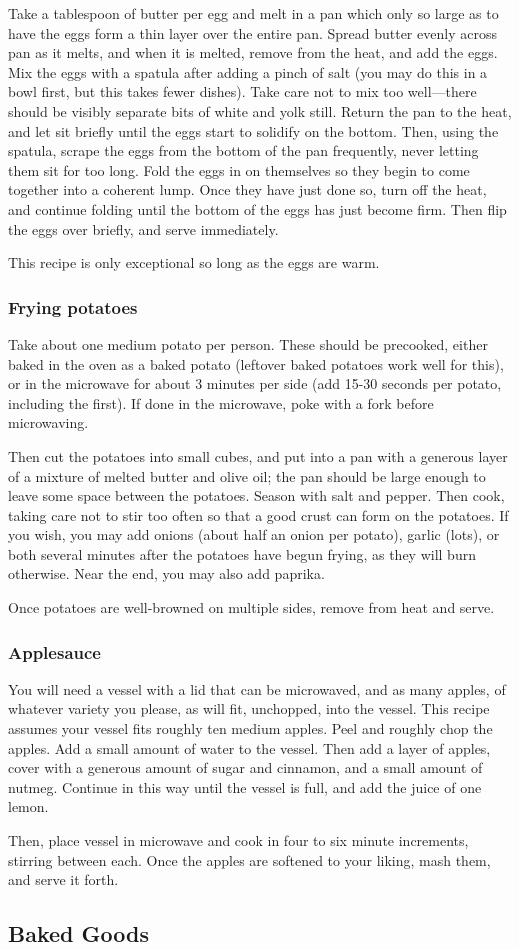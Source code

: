\documentclass[10pt]{article}
\begin{document}
Take a tablespoon of butter per egg and melt in a pan which only so large as to have the eggs form a thin layer over the entire pan.
Spread butter evenly across pan as it melts, and when it is melted, remove from the heat, and add the eggs.
Mix the eggs with a spatula after adding a pinch of salt (you may do this in a bowl first, but this takes fewer dishes).
Take care not to mix too well---there should be visibly separate bits of white and yolk still.
Return the pan to the heat, and let sit briefly until the eggs start to solidify on the bottom.
Then, using the spatula, scrape the eggs from the bottom of the pan frequently, never letting them sit for too long.
Fold the eggs in on themselves so they begin to come together into a coherent lump.
Once they have just done so, turn off the heat, and continue folding until the bottom of the eggs has just become firm.
Then flip the eggs over briefly, and serve immediately.

This recipe is only exceptional so long as the eggs are warm.

\subsubsection*{Frying potatoes}

Take about one medium potato per person.
These should be precooked, either baked in the oven as a baked potato (leftover baked potatoes work well for this), or in the microwave for about 3 minutes per side (add 15-30 seconds per potato, including the first).
If done in the microwave, poke with a fork before microwaving.

Then cut the potatoes into small cubes, and put into a pan with a generous layer of a mixture of melted butter and olive oil; the pan should be large enough to leave some space between the potatoes.
Season with salt and pepper.
Then cook, taking care not to stir too often so that a good crust can form on the potatoes.
If you wish, you may add onions (about half an onion per potato), garlic (lots), or both several minutes after the potatoes have begun frying, as they will burn otherwise.
Near the end, you may also add paprika.

Once potatoes are well-browned on multiple sides, remove from heat and serve.

\subsubsection*{Applesauce}

You will need a vessel with a lid that can be microwaved, and as many apples, of whatever variety you please, as will fit, unchopped, into the vessel.
This recipe assumes your vessel fits roughly ten medium apples.
Peel and roughly chop the apples.
Add a small amount of water to the vessel.
Then add a layer of apples, cover with a generous amount of sugar and cinnamon, and a small amount of nutmeg.
Continue in this way until the vessel is full, and add the juice of one lemon.

Then, place vessel in microwave and cook in four to six minute increments, stirring between each.
Once the apples are softened to your liking, mash them, and serve it forth.

\subsection*{Baked Goods}
\end{document}
